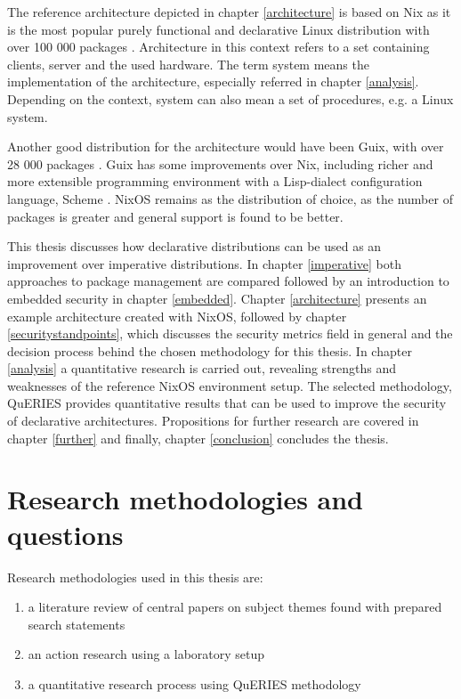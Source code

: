 The reference architecture depicted in chapter \ref{architecture} is
based on Nix as it is the most popular purely functional and declarative
Linux distribution with over 100 000 packages
\cite{nixosNixOSSearch}. Architecture in this context refers to a 
set containing clients, server and the used hardware. The term
system means the implementation of the architecture, especially
referred in chapter \ref{analysis}. Depending on the context, system
can also mean a set of procedures, e.g. a Linux system. 

Another good distribution for the architecture would have been Guix, with over
28 000 packages \cite{gnuPackagesx2014}. Guix has some improvements
over Nix, including richer and more extensible programming environment
with a Lisp-dialect configuration language, Scheme
\cite{courtes2021deploiements}. NixOS remains as the distribution of
choice, as the number of packages is greater and general support is
found to be better.

This thesis discusses how declarative distributions can be used as an
improvement over imperative distributions. In chapter \ref{imperative}
both approaches to package management are compared followed by an
introduction to embedded security in chapter \ref{embedded}. Chapter
\ref{architecture} presents an example architecture created with
NixOS, followed by chapter \ref{securitystandpoints}, which discusses
the security metrics field in general and the decision process behind
the chosen methodology for this thesis. In chapter \ref{analysis} a
quantitative research is carried out, revealing strengths and
weaknesses of the reference NixOS environment setup. The selected
methodology, QuERIES provides quantitative results that can be used to
improve the security of declarative architectures. Propositions for
further research are covered in chapter \ref{further} and finally,
chapter \ref{conclusion} concludes the thesis.

\section{Research methodologies and questions}

Research methodologies used in this thesis are:
\begin{enumerate}
\item a literature review of central papers on subject themes found
  with prepared search statements
\item an action research using a laboratory setup
\item a quantitative research process using QuERIES methodology
\end{enumerate}


